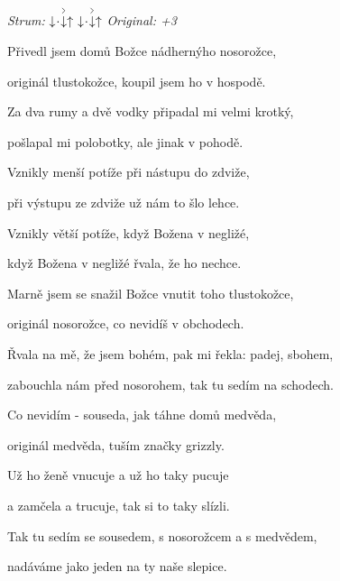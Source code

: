 \begin{song}


 \quad
\textit{Strum:} $\Down\Miss\AccentDown\Up\ \Down\Miss\AccentDown\Up$ \quad
\textit{Original: +3}

\Large


\Large

\bigskip

Přivedl jsem domů Božce nádhernýho nosorožce, \par
{}originál tlustokožce, koupil jsem ho v hospodě. \par
{}Za dva rumy a dvě vodky připadal mi velmi krotký, \par
{}pošlapal mi polobotky, ale jinak v pohodě. \par

\bigskip

Vznikly menší potíže při nástupu do zdviže, \par
{}při výstupu ze zdviže už nám to šlo lehce. \par
{}Vznikly větší potíže, když Božena v negližé, \par
{}když Božena v negližé řvala, že ho nechce. \par

\bigskip

Marně jsem se snažil Božce vnutit toho tlustokožce, \par
{}originál nosorožce, co nevidíš v obchodech. \par
{}Řvala na mě, že jsem bohém, pak mi řekla: padej, sbohem, \par
{}zabouchla nám před nosorohem, tak tu sedím na schodech. \par

\bigskip

Co nevidím - souseda, jak táhne domů medvěda, \par
{}originál medvěda, tuším značky grizzly. \par
{}Už ho ženě vnucuje a už ho taky pucuje \par
a zamčela a trucuje, tak si to taky slízli. \par

\bigskip

Tak tu sedím se sousedem, s nosorožcem a s medvědem, \par
{}nadáváme jako jeden na ty naše slepice. \par

\end{song}
